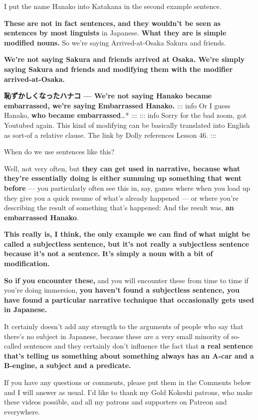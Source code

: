 I put the name Hanako into Katakana in the second example sentence.

{}

{\bf These are not in fact sentences, and they wouldn't be seen as sentences by most linguists} in Japanese. {\bf What they are is simple modified nouns.} So we're saying Arrived-at-Osaka Sakura and friends.

{\bf We're not saying Sakura and friends arrived at Osaka. We're simply saying Sakura and friends and modifying them with the modifier arrived-at-Osaka.}

{\bf 恥ずかしくなったハナコ --- We're not saying Hanako became embarrassed, we're saying Embarrassed Hanako.} ::: info Or I guess Hanako, {\bf who became embarrassed}\ldots{}* {} ::: ::: info Sorry for the bad zoom, got Youtubed again. This kind of modifying can be basically translated into English as sort-of a relative clause. The link by Dolly references Lesson 46. :::

When do we use sentences like this?

Well, not very often, but {\bf they can get used in narrative, because what they're essentially doing is either summing up something that went before} --- you particularly often see this in, say, games where when you load up they give you a quick resume of what's already happened --- or where you're describing the result of something that's happened: And the result was, {\bf an embarrassed Hanako}.

{\bf This really is, I think, the only example we can find of what might be called a subjectless sentence, but it's not really a subjectless sentence because it's not a sentence.} {\bf It's simply a noun with a bit of modification.}

{\bf So if you encounter these,} and you will encounter these from time to time if you're doing immersion, {\bf you haven't found a subjectless sentence, you have found a particular narrative technique that occasionally gets used in Japanese.}

It certainly doesn't add any strength to the arguments of people who say that there's no subject in Japanese, because these are a very small minority of so-called sentences and they certainly don't influence the fact that {\bf a real sentence that's telling us something about something always has an A-car and a B-engine, a subject and a predicate.}

If you have any questions or comments, please put them in the Comments below and I will answer as usual. I'd like to thank my Gold Kokeshi patrons, who make these videos possible, and all my patrons and supporters on Patreon and everywhere.

